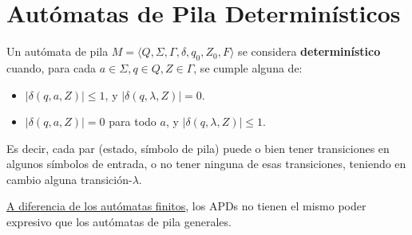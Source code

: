 \section{Autómatas de Pila Determinísticos}

Un autómata de pila $M = \langle Q, \Sigma, \Gamma, \delta, q_0, Z_0, F \rangle$ se considera \textbf{determinístico} cuando, para cada $a \in \Sigma, q \in Q, Z \in \Gamma$, se cumple alguna de:
\begin{itemize}
    \item $|\delta(q, a, Z)| \leq 1$, y $|\delta(q, \lambda, Z)| = 0$.
    \item $|\delta(q, a, Z)| = 0$ para todo $a$, y $|\delta(q, \lambda, Z)| \leq 1$.
\end{itemize}

Es decir, cada par (estado, símbolo de pila) puede o bien tener transiciones en algunos símbolos de entrada, o no tener ninguna de esas transiciones, teniendo en cambio alguna transición-$\lambda$.

\hyperref[equivalencia-afd-afnd]{A diferencia de los autómatas finitos}, los APDs no tienen el mismo poder expresivo que los autómatas de pila generales.
